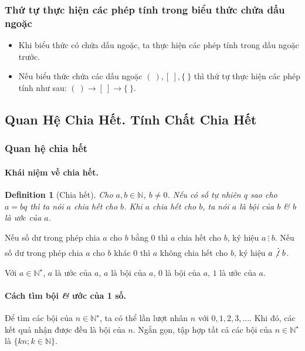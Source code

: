 \documentclass{article}
\numberwithin{equation}{section}
\newtheorem{definition}{Definition}[section]
\begin{document}
\subsubsection{Thứ tự thực hiện các phép tính trong biểu thức chứa dấu ngoặc}
\begin{tcolorbox}
	\begin{itemize}
		\item Khi biểu thức có chứa dấu ngoặc, ta thực hiện các phép tính trong dấu ngoặc trước.
		\item Nếu biểu thức chứa các dấu ngoặc $(\ ),[\ ],\{\ \}$ thì thứ tự thực hiện các phép tính như sau: $(\ )\to[\ ]\to\{\ \}$.
	\end{itemize}	
\end{tcolorbox}

\subsection{Quan Hệ Chia Hết. Tính Chất Chia Hết}

\subsubsection{Quan hệ chia hết}

\paragraph{Khái niệm về chia hết.}
\begin{definition}[Chia hết]
	Cho $a,b\in\mathbb{N}$, $b\ne 0$. Nếu có số tự nhiên $q$ sao cho $a = bq$ thì ta nói \emph{$a$ chia hết cho $b$}. Khi $a$ chia hết cho $b$, ta nói $a$ là \emph{bội} của $b$ \textit{\&} $b$ là \emph{ước} của $a$.
\end{definition}
Nếu số dư trong phép chia $a$ cho $b$ bằng 0 thì $a$ chia hết cho $b$, ký hiệu $a\ \vdots\ b$. Nếu số dư trong phép chia $a$ cho $b$ khác 0 thì $a$ không chia hết cho $b$, ký hiệu $a\not\vdots\ b$.

Với $a\in\mathbb{N}^\star$, $a$ là ước của $a$, $a$ là bội của $a$, 0 là bội của $a$, $1$ là ước của $a$.

\paragraph{Cách tìm bội \textit{\&} ước của 1 số.} Để tìm các bội của $n\in\mathbb{N}^\star$, ta có thể lần lượt nhân $n$ với $0,1,2,3,\ldots$. Khi đó, các kết quả nhận được đều là bội của $n$. Ngắn gọn, tập hợp tất cả các bội của $n\in\mathbb{N}^\star$ là $\{kn;k\in\mathbb{N}\}$.
\end{document}

